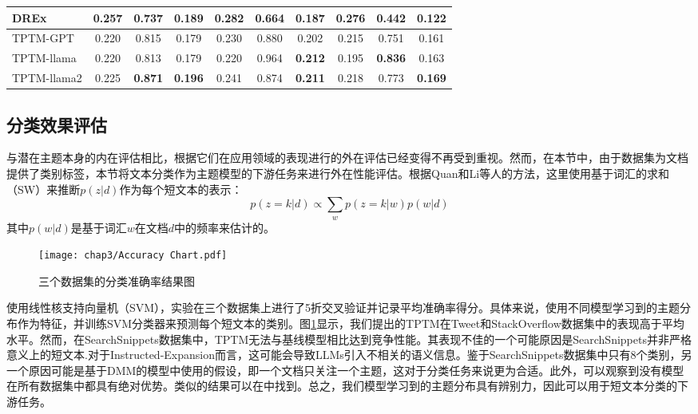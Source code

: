 \begin{table}[ht]
{\begin{tabular}{lccc|ccc|ccc}
        DREx & \textbf{0.257} & 0.737 & 0.189 & \textbf{0.282} & 0.664 & 0.187 & \textbf{0.276} & 0.442 & 0.122 \\\hline
        TPTM-GPT & 0.220 & 0.815 & 0.179 & 0.230 & 0.880 & 0.202 & 0.215 & 0.751 & 0.161 \\
        TPTM-llama & 0.220 & 0.813 & 0.179 & 0.220 & 0.964 & \textbf{0.212} & 0.195 & \textbf{0.836} & 0.163 \\
        TPTM-llama2 & 0.225 & \textbf{0.871} & \textbf{0.196} & 0.241 & 0.874 & \textbf{0.211} & 0.218  & 0.773 & \textbf{0.169} \\\hline
    \end{tabular}
    }
\end{table}

\subsection{分类效果评估}
与潜在主题本身的内在评估相比，根据它们在应用领域的表现进行的外在评估已经变得不再受到重视\cite{survey_2022,survey_2023}。然而，在本节中，由于数据集为文档提供了类别标签，本节将文本分类作为主题模型的下游任务来进行外在性能评估。根据Quan\cite{SATM}和Li\cite{GPUDMM}等人的方法，这里使用基于词汇的求和（SW）来推断$p(z|d)$作为每个短文本的表示：
\begin{equation}
p(z=k|d)\propto\sum_w p(z=k|w)p(w|d)
\end{equation}
其中$p(w|d)$是基于词汇$w$在文档$d$中的频率来估计的。

\begin{figure}[ht]
    \centering
    \texttt{[image: chap3/Accuracy Chart.pdf]}
    \caption{三个数据集的分类准确率结果图}
    \label{AccuracyChart}
\end{figure}

使用线性核支持向量机（SVM），实验在三个数据集上进行了5折交叉验证并记录平均准确率得分。具体来说，使用不同模型学习到的主题分布作为特征，并训练SVM分类器来预测每个短文本的类别。图\ref{AccuracyChart}显示，我们提出的TPTM在Tweet和StackOverflow数据集中的表现高于平均水平。然而，在SearchSnippets数据集中，TPTM无法与基线模型相比达到竞争性能。其表现不佳的一个可能原因是SearchSnippets并非严格意义上的短文本.对于Instructed-Expansion而言，这可能会导致LLMs引入不相关的语义信息。鉴于SearchSnippets数据集中只有8个类别，另一个原因可能是基于DMM的模型中使用的假设，即一个文档只关注一个主题，这对于分类任务来说更为合适。此外，可以观察到没有模型在所有数据集中都具有绝对优势。类似的结果可以在\cite{STTM}中找到。总之，我们模型学习到的主题分布具有辨别力，因此可以用于短文本分类的下游任务。

